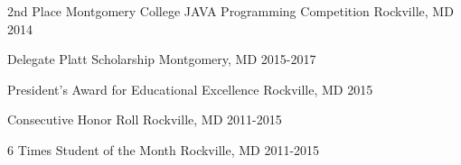 

\begin{cvhonors}

\cvhonor
    {2nd Place}
    {Montgomery College JAVA Programming Competition}
    {Rockville, MD}
    {2014}

  \cvhonorSimple
    {}
    {Delegate Platt Scholarship}
    {Montgomery, MD}
    {2015-2017}

  \cvhonorSimple
    {}
    {President's Award for Educational Excellence}
    {Rockville, MD}
    {2015}

  \cvhonor
    {Consecutive}
    {Honor Roll}
    {Rockville, MD}
    {2011-2015}

  \cvhonor
    {6 Times}
    {Student of the Month}
    {Rockville, MD}
    {2011-2015}

\end{cvhonors}
